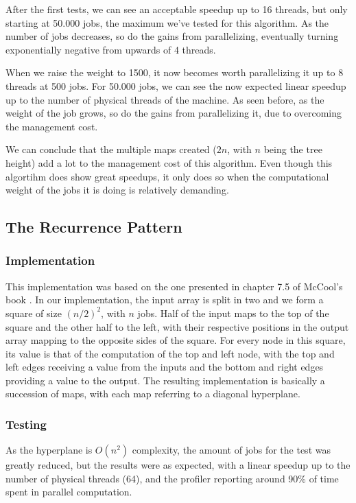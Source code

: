 \documentclass[10pt,journal]{IEEEtran}
\begin{document}
After the first tests, we can see an acceptable speedup up to 16 threads, but only starting at 50.000 jobs, the maximum we've tested for this algorithm. As the number of jobs decreases, so do the gains from parallelizing, eventually turning exponentially negative from upwards of 4 threads.

When we raise the weight to 1500, it now becomes worth parallelizing it up to 8 threads at 500 jobs. For 50.000 jobs, we can see the now expected linear speedup up to the number of physical threads of the machine. As seen before, as the weight of the job grows, so do the gains from parallelizing it, due to overcoming the management cost.

We can conclude that the multiple maps created ($ 2n $, with $ n $ being the tree height) add a lot to the management cost of this algorithm. Even though this algortihm does show great speedups, it only does so when the computational weight of the jobs it is doing is relatively demanding.

\subsection{The Recurrence Pattern}

\subsubsection{Implementation}

This implementation was based on the one presented in chapter 7.5 of McCool's book \cite{mccool}. In our implementation, the input array is split in two and we form a square of size $ (n / 2)^2 $, with $ n $ jobs. Half of the input maps to the top of the square and the other half to the left, with their respective positions in the output array mapping to the opposite sides of the square. For every node in this square, its value is that of the computation of the top and left node, with the top and left edges receiving a value from the inputs and the bottom and right edges providing a value to the output. The resulting implementation is basically a succession of maps, with each map referring to a diagonal hyperplane. 

\subsubsection{Testing}

As the hyperplane is $ O(n^2) $ complexity, the amount of jobs for the test was greatly reduced, but the results were as expected, with a linear speedup up to the number of physical threads (64), and the profiler reporting around 90\% of time spent in parallel computation.
\end{document}
